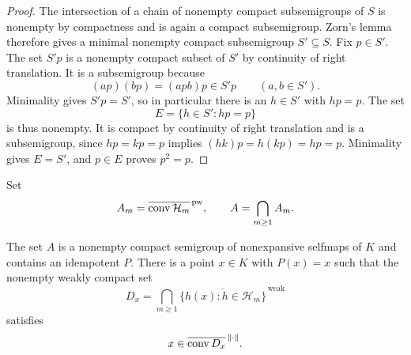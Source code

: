 \begin{proof}
The intersection of a chain of nonempty compact subsemigroups of $S$
is nonempty by compactness and is again a compact subsemigroup.
Zorn's lemma therefore gives a minimal nonempty compact subsemigroup
$S'\subseteq S$.  Fix $p\in S'$.  The set $S'p$ is a nonempty compact
subset of $S'$ by continuity of right translation.  It is a
subsemigroup because
\[
 (ap)(bp)=(apb)p\in S'p\qquad(a,b\in S').
\]
Minimality gives $S'p=S'$, so in particular there is an $h\in S'$ with
$hp=p$.  The set
\[
 E=\{h\in S':hp=p\}
\]
is thus nonempty.  It is compact by continuity of right translation
and is a subsemigroup, since $hp=kp=p$ implies
$(hk)p=h(kp)=hp=p$.  Minimality gives $E=S'$, and $p\in E$ proves
$p^2=p$.
\end{proof}

Set
\begin{equation}
\label{eq:map-closures}
 A_m=\overline{\operatorname{conv}\mathcal H_m}^{\,\mathrm{pw}},
 \qquad A=\bigcap_{m\geq1}A_m.
\end{equation}

\begin{proposition}
\label{prop:anchor}
The set $A$ is a nonempty compact semigroup of nonexpansive selfmaps
of $K$ and contains an idempotent $P$.  There is a point $x\in K$ with
$P(x)=x$ such that the nonempty weakly compact set
\begin{equation}
\label{eq:anchor-tail-set}
 D_x=\bigcap_{m\geq1}
       \overline{\{h(x):h\in\mathcal H_m\}}^{\,\mathrm{weak}}
\end{equation}
satisfies
\begin{equation}
\label{eq:anchor-convex-hull}
 x\in\overline{\operatorname{conv} D_x}^{\,\lVert\cdot\rVert}.
\end{equation}
\end{proposition}

